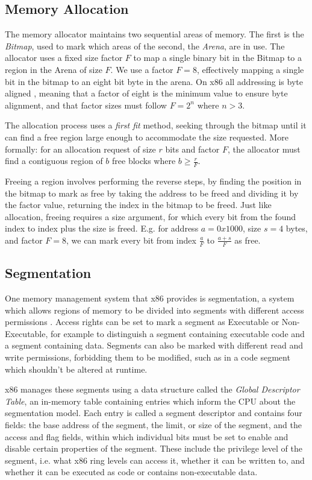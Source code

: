 \documentclass[10pt]{report}
\begin{document}
\subsection{Memory Allocation} \label{sec:memalloc}
The memory allocator maintains two sequential areas of memory. The first is the \textit{Bitmap}, used to mark which areas of the second, the \textit{Arena}, are in use. The allocator uses a fixed size factor $F$ to map a single binary bit in the Bitmap to a region in the Arena of size $F$. We use a factor $F = 8$, effectively mapping a single bit in the bitmap to an eight bit byte in the arena. On x86 all addressing is byte aligned \cite{guide2011intel}, meaning that a factor of eight is the minimum value to ensure byte alignment, and that factor sizes must follow $F = 2^n$ where $n > 3 $.

The allocation process uses a \textit{first fit} method, seeking through the bitmap until it can find a free region large enough to accommodate the size requested. More formally: for an allocation request of size $r$ bits and factor $F$, the allocator must find a contiguous region of $b$ free blocks where $b \geq \frac{r}{F}$.

Freeing a region involves performing the reverse steps, by finding the position in the bitmap to mark as free by taking the address to be freed and dividing it by the factor value, returning the index in the bitmap to be freed. Just like allocation, freeing requires a size argument, for which every bit from the found index to index plus the size is freed. E.g. for address $a = 0x1000$, size $s = 4$ bytes, and factor $F = 8$, we can mark every bit from index $\frac{a}{F}$ to $\frac{a + s}{F}$ as free.

\subsection{Segmentation}
One memory management system that x86 provides is segmentation, a system which allows regions of memory to be divided into segments with different access permissions \cite{guide2011intel}. Access rights can be set to mark a segment as Executable or Non-Executable, for example to distinguish a segment containing executable code and a segment containing data. Segments can also be marked with different read and write permissions, forbidding them to be modified, such as in a code segment which shouldn't be altered at runtime.

x86 manages these segments using a data structure called the \textit{Global Descriptor Table}, an in-memory table containing entries which inform the CPU about the segmentation model. Each entry is called a segment descriptor\cite{guide2011intel} and contains four fields: the base address of the segment, the limit, or size of the segment, and the access and flag fields, within which individual bits must be set to enable and disable certain properties of the segment. These include the privilege level of the segment, i.e. what x86 ring levels can access it, whether it can be written to, and whether it can be executed as code or contains non-executable data.
\end{document}
